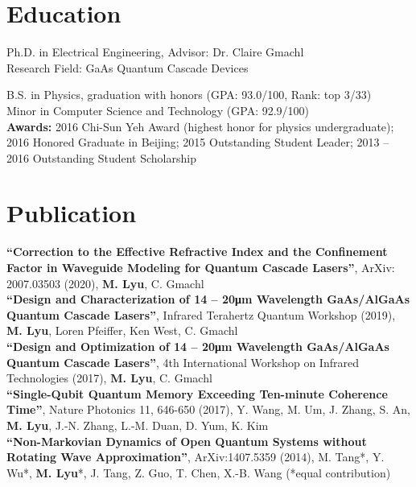 \documentclass[11pt,letterpaper]{resume}
\begin{document}
\section{Education}
Ph.D. in Electrical Engineering, Advisor: Dr. Claire Gmachl \\
Research Field: GaAs Quantum Cascade Devices

B.S. in Physics, graduation with honors (GPA: 93.0/100, Rank: top 3/33)\\
Minor in Computer Science and Technology (GPA: 92.9/100)\\
\textbf{Awards:}
2016 Chi-Sun Yeh Award (highest honor for physics undergraduate); 
2016 Honored Graduate in Beijing; 
2015 Outstanding Student Leader; 
2013 -- 2016 Outstanding Student Scholarship\medskip


\section{Publication}
\textbf{``Correction to the Effective Refractive Index and the Confinement Factor in Waveguide Modeling for Quantum Cascade Lasers''}, 
ArXiv: 2007.03503 (2020), \textbf{M. Lyu}, C. Gmachl \\
\textbf{``Design and Characterization of 14 -- 20\si{\micro m} Wavelength 
GaAs/AlGaAs Quantum Cascade Lasers''}, 
Infrared Terahertz Quantum Workshop (2019), 
\textbf{M. Lyu}, Loren Pfeiffer, Ken West, C. Gmachl \\
\textbf{``Design and Optimization of 14 -- 20\si{\micro m} Wavelength 
GaAs/AlGaAs Quantum Cascade Lasers''}, 
4th International Workshop on Infrared Technologies (2017), 
\textbf{M. Lyu}, C. Gmachl \\
\textbf{``Single-Qubit Quantum Memory Exceeding Ten-minute Coherence Time''}, 
Nature Photonics 11, 646-650 (2017), Y. Wang, M. Um, J. Zhang, S. An, 
\textbf{M. Lyu}, J.-N. Zhang, L.-M. Duan, D. Yum, K. Kim \\
\textbf{``Non-Markovian Dynamics of Open Quantum Systems without Rotating 
Wave Approximation''}, 
ArXiv:1407.5359 (2014), 
M. Tang*, Y. Wu*, \textbf{M. Lyu}*, J. Tang, Z. Guo, T. Chen, X.-B. Wang  
(*equal contribution)
\end{document}
